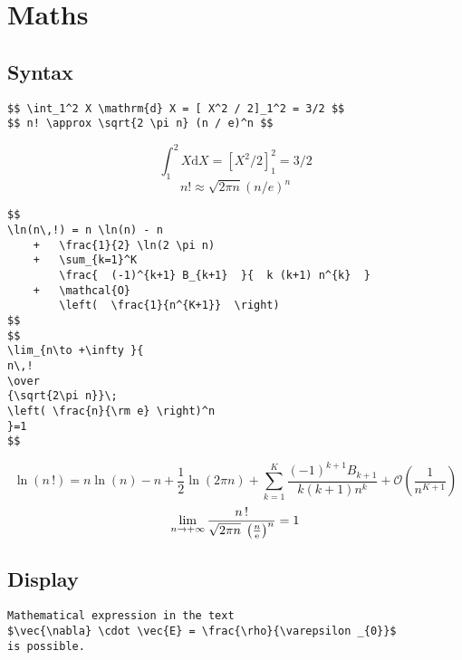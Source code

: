 \chapter{Maths}

\section{Syntax}

\begin{LaTeXsource}[Symbols]
\begin{verbatim}
$$ \int_1^2 X \mathrm{d} X = [ X^2 / 2]_1^2 = 3/2 $$
$$ n! \approx \sqrt{2 \pi n} (n / e)^n $$
\end{verbatim}
\end{LaTeXsource}

\begin{Results}
$$ \int_1^2 X \mathrm{d} X = [ X^2 / 2]_1^2 = 3/2 $$
$$ n! \approx \sqrt{2 \pi n} (n / e)^n $$
\end{Results}

\pagebreak

\begin{LaTeXsource}[Boxing]
\begin{verbatim}
$$
\ln(n\,!) = n \ln(n) - n
    +   \frac{1}{2} \ln(2 \pi n)
    +   \sum_{k=1}^K
        \frac{  (-1)^{k+1} B_{k+1}  }{  k (k+1) n^{k}  }
    +   \mathcal{O}
        \left(  \frac{1}{n^{K+1}}  \right)
$$
$$
\lim_{n\to +\infty }{
n\,!
\over
{\sqrt{2\pi n}}\;
\left( \frac{n}{\rm e} \right)^n
}=1
$$
\end{verbatim}
\end{LaTeXsource}

\begin{Results}
$$
\ln(n\,!) =
        n \ln(n) - n
    +   \frac{1}{2} \ln(2 \pi n)
    +   \sum_{k=1}^K
        \frac{ (-1)^{k+1} B_{k+1} }{ k (k+1) n^{k} }
    +   \mathcal{O}
        \left(
            \frac{1}{n^{K+1}}
        \right)
$$
$$
\lim_{n\to +\infty }{
n\,!
\over
{\sqrt{2\pi n}}\;\left(\frac{n}{\rm e} \right)^n
}=1
$$
\end{Results}

\section{Display}

\begin{LaTeXsource}[Inline]
\begin{verbatim}
Mathematical expression in the text
$\vec{\nabla} \cdot \vec{E} = \frac{\rho}{\varepsilon _{0}}$
is possible.
\end{verbatim}
\end{LaTeXsource}

